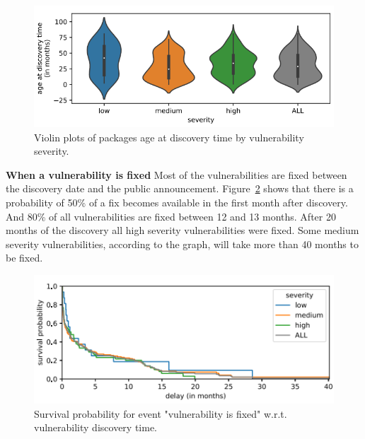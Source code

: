 \documentclass[pdf,bookmarks,colorlinks=true]{IEEEtran}
\begin{document}
\begin{figure}[h]
	\centering
	\includegraphics[scale=0.45]{WhenDiscovered.png}
	\caption{Violin plots of packages age at discovery time by vulnerability severity.}
	\label{WhenDiscovered}
\end{figure}


\textbf{When a vulnerability is fixed}
Most of the vulnerabilities are fixed between the discovery date and the public announcement. Figure~\ref{WhenIsFixed} shows that there is a probability of 50\% of a fix becomes available in the first month after discovery. And 80\% of all vulnerabilities are fixed between 12 and 13 months. After 20 months of the discovery all high severity vulnerabilities were fixed. Some medium severity vulnerabilities, according to the graph, will take more than 40 months to be fixed.

\begin{figure}[h]
	\centering
	\includegraphics[scale=0.75]{WhenIsFixed.png}
	\caption{Survival probability for event "vulnerability is fixed" w.r.t. vulnerability discovery time.}
	\label{WhenIsFixed}
\end{figure}

\end{document}
